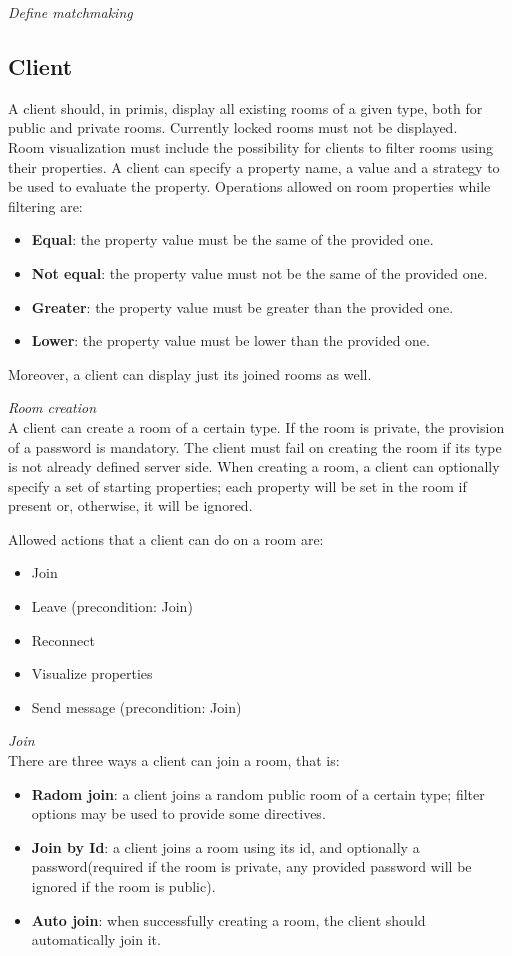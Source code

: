 \bigskip
\textit{Define matchmaking}
\\


\subsection{Client}

A client should, in primis, display all existing rooms of a given type, both for public and private rooms. Currently locked rooms must not be displayed.
\\
Room visualization must include the possibility for clients to filter rooms using their properties. A client can specify a property name, a value and a strategy to be used to evaluate the property. Operations allowed on room properties while filtering are:
\begin{itemize}
\item \textbf{Equal}: the property value must be the same of the provided one.
\item \textbf{Not equal}: the property value must not be the same of the provided one.
\item \textbf{Greater}: the property value must be greater than the provided one.
\item \textbf{Lower}: the property value must be lower than the provided one.
\end{itemize}

Moreover, a client can display just its joined rooms as well.

\bigskip
\textit{Room creation}
\\
A client can create a room of a certain type. If the room is private, the provision of a password is mandatory.
The client must fail on creating the room if its type is not already defined server side.
When creating a room, a client can optionally specify a set of starting properties; each property will be set in the room if present or, otherwise, it will be ignored.

\bigskip
Allowed actions that a client can do on a room are:
\begin{itemize}
\item Join
\item Leave (precondition: Join)
\item Reconnect
\item Visualize properties
\item Send message (precondition: Join)
\end{itemize}

\bigskip
\textit{Join}
\\
There are three ways a client can join a room, that is:
\begin{itemize}
\item \textbf{Radom join}: a client joins a random public room of a certain type; filter options may be used to provide some directives.
\item \textbf{Join by Id}: a client joins a room using its id, and optionally a password(required if the room is private, any provided password will be ignored if the room is public).
\item \textbf{Auto join}: when successfully creating a room, the client should automatically join it.
\end{itemize}  

